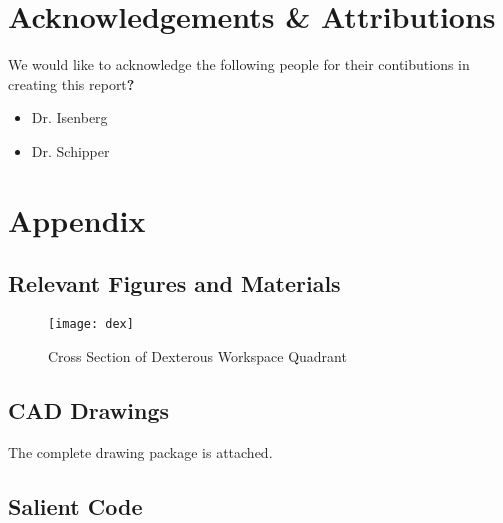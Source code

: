 \newpage
\section*{Acknowledgements \& Attributions}
We would like to acknowledge the following people for their contibutions in creating this report\textbf{?}
\begin{itemize}
  \item Dr. Isenberg
  \item Dr. Schipper
\end{itemize}
\newpage



\newpage
\appendix
\renewcommand\thesection{\Roman{section}}
\renewcommand\thesubsection{\roman{subsection}}
\section{Appendix}\label{sec:app}
\subsection{Relevant Figures and Materials}
\begin{figure}[htp]
  \centering
  \texttt{[image: dex]}
  \caption{Cross Section of Dexterous Workspace Quadrant}
  \label{fig:dex}
\end{figure}
\subsection{CAD Drawings}
The complete drawing package is attached.

\subsection{Salient Code}

\vspace{10ex}


\vspace{10ex}


\vspace{10ex}

% 


